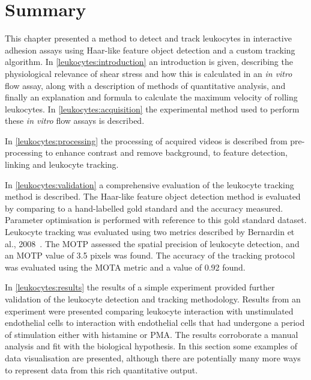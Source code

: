 \section{Summary}
\label{leukocytes:summary}
This chapter presented a method to detect and track leukocytes in interactive adhesion assays using Haar-like feature object detection and a custom tracking algorithm. In \autoref{leukocytes:introduction} an introduction is given, describing the physiological relevance of shear stress and how this is calculated in an \emph{in vitro} flow assay, along with a description of methods of quantitative analysis, and finally an explanation and formula to calculate the maximum velocity of rolling leukocytes. In \autoref{leukocytes:acquisition} the experimental method used to perform these \emph{in vitro} flow assays is described.

In \autoref{leukocytes:processing} the processing of acquired videos is described from pre-processing to enhance contrast and remove background, to feature detection, linking and leukocyte tracking. 

In \autoref{leukocytes:validation} a comprehensive evaluation of the leukocyte tracking method is described. The Haar-like feature object detection method is evaluated by comparing to a hand-labelled gold standard and the accuracy measured. Parameter optimisation is performed with reference to this gold standard dataset. Leukocyte tracking was evaluated using two metrics described by Bernardin et al., 2008~\cite{Bernardin2008}. The MOTP assessed the spatial precision of leukocyte detection, and an MOTP value of 3.5 pixels was found. The accuracy of the tracking protocol was evaluated using the MOTA metric and a value of 0.92 found.

In \autoref{leukocytes:results} the results of a simple experiment provided further validation of the leukocyte detection and tracking methodology. Results from an experiment were presented comparing leukocyte interaction with unstimulated endothelial cells to interaction with endothelial cells that had undergone a period of stimulation either with histamine or PMA. The results corroborate a manual analysis and fit with the biological hypothesis. In this section some examples of data visualisation are presented, although there are potentially many more ways to represent data from this rich quantitative output.

